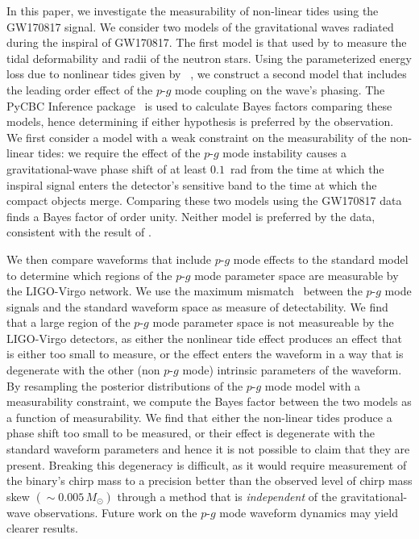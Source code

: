 In this paper, we investigate the measurability of non-linear tides using the
GW170817 signal. We consider two models of the gravitational waves radiated
during the inspiral of GW170817. The first model is that used by
\cite{de2018tidal} to measure the tidal deformability and radii of the neutron
stars. Using the parameterized energy loss due to nonlinear tides given by
~\cite{Essick:2016tkn}, we construct a second model that includes the
leading order effect of the $p$-$g$ mode coupling on the wave's phasing.  The
PyCBC Inference package~\citep{alex_nitz_2018_1208115,biwer2019pycbc} is used
to calculate Bayes factors comparing these models, hence determining if either
hypothesis is preferred by the observation.  We first consider a model with a
weak constraint on the measurability of the non-linear tides: we require the
effect of the $p$-$g$ mode instability causes a gravitational-wave phase shift
of at least $0.1$~rad from the time at which the inspiral signal enters the
detector's sensitive band to the time at which the compact objects merge.
Comparing these two models using the GW170817 data finds a Bayes factor of
order unity. Neither model is preferred by the data, consistent with the result
of \cite{abbott2019constraining}. 

We then compare waveforms that include $p$-$g$ mode effects to the standard
model to determine which regions of the $p$-$g$ mode parameter space are
measurable by the LIGO-Virgo network.  We use the maximum
mismatch~\cite{Apostolatos:1995pj} between the $p$-$g$ mode signals and the
standard waveform space as measure of detectability.  We find that a large
region of the $p$-$g$ mode parameter space is not measureable by the
LIGO-Virgo detectors, as either the nonlinear tide effect produces an effect
that is either too small to measure, or the effect enters the waveform in a
way that is degenerate with the other (non $p$-$g$ mode) intrinsic parameters
of the waveform. By resampling the posterior distributions of the $p$-$g$ mode
model with a measurability constraint, we compute the Bayes factor between the
two models as a function of measurability. We find that either the non-linear tides 
produce a phase shift too small to be measured, or their effect is degenerate
with the standard waveform parameters and hence it is not possible to claim
that they are present. Breaking this degeneracy is difficult, as
it would require measurement of the binary's chirp mass to a precision better
than the observed level of chirp mass skew $(\sim 0.005\, M_\odot)$
through a method that is \emph{independent} of the gravitational-wave observations.
Future work on the $p$-$g$ mode waveform dynamics may yield clearer results.

